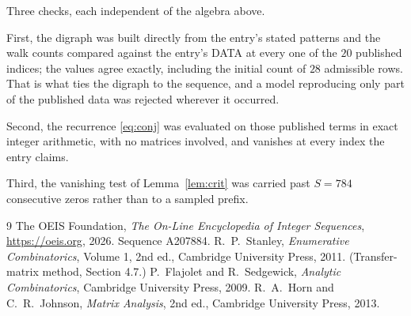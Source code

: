 \documentclass[11pt,a4paper]{article}
\theoremstyle{plain}
\theoremstyle{definition}
\begin{document}
Three checks, each independent of the algebra above.

First, the digraph was built directly from the entry's stated patterns and the walk counts
compared against the entry's DATA at every one of the $20$ published indices; the
values agree exactly, including the initial count of $28$ admissible rows. That is
what ties the digraph to the sequence, and a model reproducing only part of the published
data was rejected wherever it occurred.

Second, the recurrence \eqref{eq:conj} was evaluated on those published terms in exact
integer arithmetic, with no matrices involved, and vanishes at every index the entry claims.

Third, the vanishing test of Lemma~\ref{lem:crit} was carried past $S=784$ consecutive
zeros rather than to a sampled prefix.

\begin{thebibliography}{9}
 The OEIS Foundation, \emph{The On-Line Encyclopedia of Integer
Sequences}, \url{https://oeis.org}, 2026. Sequence A207884.
 R.~P.~Stanley, \emph{Enumerative Combinatorics}, Volume 1, 2nd ed.,
Cambridge University Press, 2011. (Transfer-matrix method, Section 4.7.)
 P.~Flajolet and R.~Sedgewick, \emph{Analytic Combinatorics}, Cambridge
University Press, 2009.
 R.~A.~Horn and C.~R.~Johnson, \emph{Matrix Analysis}, 2nd ed., Cambridge
University Press, 2013.
\end{thebibliography}
\end{document}
